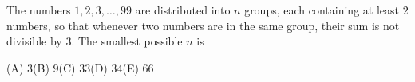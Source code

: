 The numbers $1,2,3,\dots,99$ are distributed into $n$ groups, each containing at least $2$ numbers, so that whenever two numbers are in the same group, their sum is not divisible by $3$. The smallest possible $n$ is

(A) $3$\quad (B) $9$\quad (C) $33$\quad (D) $34$\quad (E) $66$

